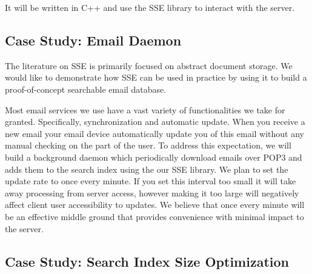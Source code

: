 It will be written in C++ and use the SSE library to interact with the server.

\subsection{ Case Study: Email Daemon }
\label{subsec:email}


The literature on SSE is primarily focused on abstract document storage. We would like to demonstrate how SSE can be used in practice by using it to build a proof-of-concept searchable email database.

Most email services we use have a vast variety of functionalities we take for granted.
Specifically, synchronization and automatic update.
When you receive a new email your email device automatically update you of this email without any manual checking on the part of the user. 
To address this expectation, we will build a background daemon which periodically download emails over POP3 and adds them to the search index using the our SSE library.
We plan to set the update rate to once every minute.
If you set this interval too small it will take away processing from server access, however making it too large will negatively affect client user accessibility to updates.
We believe that once every minute will be an effective middle ground that provides convenience with minimal impact to the server.

\subsection {Case Study: Search Index Size Optimization}
\label{subsec:size}


